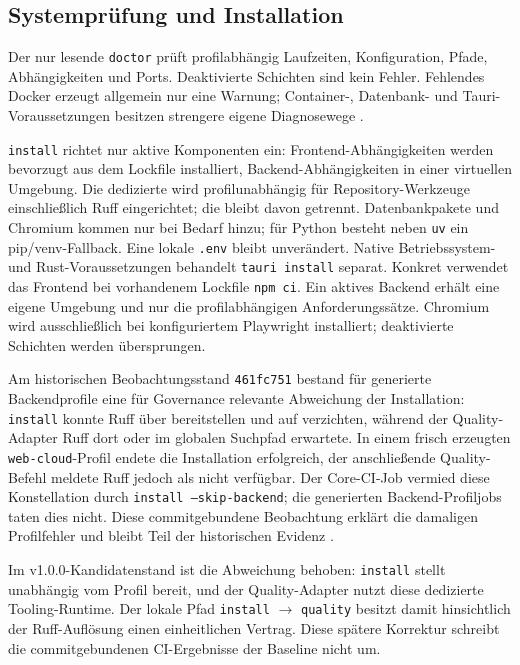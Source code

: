 \subsection{Systemprüfung und Installation}
\label{subsec:systempruefung-installation}

Der nur lesende \texttt{doctor} prüft profilabhängig Laufzeiten, Konfiguration,
Pfade, Abhängigkeiten und Ports. Deaktivierte Schichten sind kein Fehler.
Fehlendes Docker erzeugt allgemein nur eine Warnung; Container-, Datenbank- und
Tauri-Voraussetzungen besitzen strengere eigene Diagnosewege
\parencite{kleiveist2026tooling,kleiveist2026configuration}.

\texttt{install} richtet nur aktive Komponenten ein: Frontend-Abhängigkeiten
werden bevorzugt aus dem Lockfile installiert, Backend-Abhängigkeiten in einer
virtuellen Umgebung. Die dedizierte  wird profilunabhängig
für Repository-Werkzeuge einschließlich Ruff eingerichtet; die
 bleibt davon getrennt. Datenbankpakete und Chromium kommen
nur bei Bedarf hinzu; für Python besteht neben \texttt{uv} ein
pip/venv-Fallback. Eine lokale \texttt{.env} bleibt unverändert. Native
Betriebssystem- und Rust-Voraussetzungen behandelt \texttt{tauri install}
separat.
Konkret verwendet das Frontend bei vorhandenem Lockfile \texttt{npm ci}. Ein
aktives Backend erhält eine eigene Umgebung und nur die profilabhängigen
Anforderungssätze. Chromium wird ausschließlich bei konfiguriertem Playwright
installiert; deaktivierte Schichten werden übersprungen.

Am historischen Beobachtungsstand \texttt{461fc751} bestand für generierte
Backendprofile eine für Governance relevante Abweichung der Installation:
\texttt{install} konnte Ruff über  bereitstellen und auf
 verzichten, während der Quality-Adapter Ruff dort oder im
globalen Suchpfad erwartete. In einem frisch erzeugten
\texttt{web-cloud}-Profil endete die Installation erfolgreich, der
anschließende Quality-Befehl meldete Ruff jedoch als nicht verfügbar. Der
Core-CI-Job vermied diese Konstellation durch
\texttt{install --skip-backend}; die generierten Backend-Profiljobs taten dies
nicht. Diese commitgebundene Beobachtung erklärt die damaligen Profilfehler
und bleibt Teil der historischen Evidenz
\parencite{kleiveist2026quality-implementation,kleiveist2026quality-ci}.

Im v1.0.0-Kandidatenstand ist die Abweichung behoben: \texttt{install} stellt
 unabhängig vom Profil bereit, und der Quality-Adapter nutzt
diese dedizierte Tooling-Runtime. Der lokale Pfad \texttt{install}
$\rightarrow$ \texttt{quality} besitzt damit hinsichtlich der Ruff-Auflösung
einen einheitlichen Vertrag. Diese spätere Korrektur schreibt die
commitgebundenen CI-Ergebnisse der Baseline nicht um.

